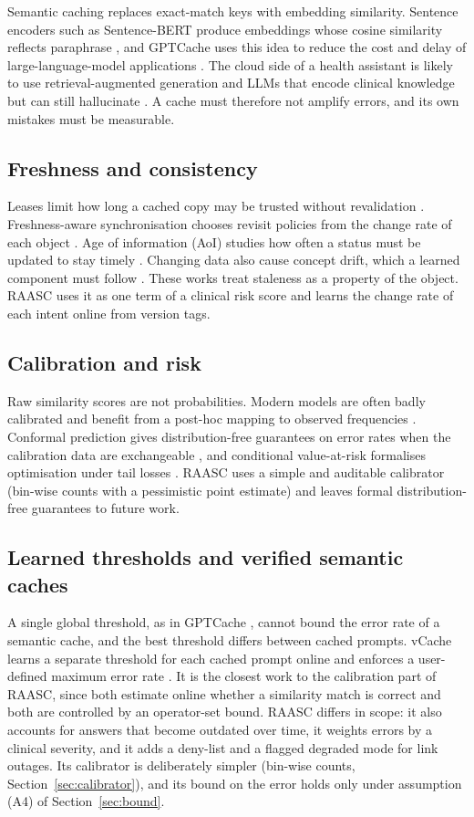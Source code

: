 \documentclass[journal]{IEEEtran}
\begin{document}
Semantic caching replaces exact-match keys with embedding similarity. Sentence encoders such as Sentence-BERT produce embeddings whose cosine similarity reflects paraphrase \cite{reimers2019}, and GPTCache uses this idea to reduce the cost and delay of large-language-model applications \cite{bang2023}. The cloud side of a health assistant is likely to use retrieval-augmented generation \cite{lewis2020} and LLMs that encode clinical knowledge \cite{singhal2023} but can still hallucinate \cite{ji2023}. A cache must therefore not amplify errors, and its own mistakes must be measurable.

\subsection{Freshness and consistency}
Leases limit how long a cached copy may be trusted without revalidation \cite{gray1989}. Freshness-aware synchronisation chooses revisit policies from the change rate of each object \cite{cho2000}. Age of information (AoI) studies how often a status must be updated to stay timely \cite{kaul2012,yates2021}. Changing data also cause concept drift, which a learned component must follow \cite{gama2014}. These works treat staleness as a property of the object. RAASC uses it as one term of a clinical risk score and learns the change rate of each intent online from version tags.

\subsection{Calibration and risk}
Raw similarity scores are not probabilities. Modern models are often badly calibrated and benefit from a post-hoc mapping to observed frequencies \cite{guo2017}. Conformal prediction gives distribution-free guarantees on error rates when the calibration data are exchangeable \cite{angelopoulos2021}, and conditional value-at-risk formalises optimisation under tail losses \cite{rockafellar2000}. RAASC uses a simple and auditable calibrator (bin-wise counts with a pessimistic point estimate) and leaves formal distribution-free guarantees to future work.

\subsection{Learned thresholds and verified semantic caches}
A single global threshold, as in GPTCache \cite{bang2023}, cannot bound the error rate of a semantic cache, and the best threshold differs between cached prompts. vCache learns a separate threshold for each cached prompt online and enforces a user-defined maximum error rate \cite{schroeder2026}. It is the closest work to the calibration part of RAASC, since both estimate online whether a similarity match is correct and both are controlled by an operator-set bound. RAASC differs in scope: it also accounts for answers that become outdated over time, it weights errors by a clinical severity, and it adds a deny-list and a flagged degraded mode for link outages. Its calibrator is deliberately simpler (bin-wise counts, Section~\ref{sec:calibrator}), and its bound on the error holds only under assumption (A4) of Section~\ref{sec:bound}.
\end{document}
